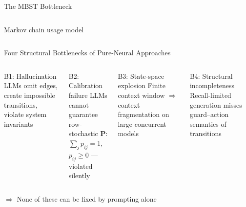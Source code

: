 \documentclass[aspectratio=169,10pt]{beamer}
\newcommand{\con}[1]{\textcolor{negative}{#1}}
\newcommand{\HL}[1]{\textcolor{emphasis}{#1}}
\begin{document}
\begin{frame}{The MBST Bottleneck}
\begin{columns}[T]
      \vspace{0.4em}
      \begin{center}\small\textcolor{neutral}{Markov chain usage model}\end{center}
  \end{columns}
\end{frame}

\begin{frame}{Four Structural Bottlenecks of Pure-Neural Approaches}
  \begin{columns}[T]
      \begin{alertblock}{\con{B1: Hallucination}}
        LLMs omit edges, create impossible transitions, violate system invariants
      \end{alertblock}
      \vspace{0.3em}
      \begin{alertblock}{\con{B2: Calibration failure}}
        LLMs cannot guarantee row-stochastic $\mathbf{P}$:\\
        $\sum_j p_{ij} = 1$, $p_{ij} \geq 0$ — violated silently
      \end{alertblock}
      \begin{alertblock}{\con{B3: State-space explosion}}
        Finite context window $\Rightarrow$ context fragmentation on large concurrent models
      \end{alertblock}
      \vspace{0.3em}
      \begin{alertblock}{\con{B4: Structural incompleteness}}
        Recall-limited generation misses guard--action semantics of transitions
      \end{alertblock}
  \end{columns}
  \vspace{0.5em}
  \begin{center}
    \HL{$\Rightarrow$ None of these can be fixed by prompting alone}
  \end{center}
\end{frame}
\end{document}
